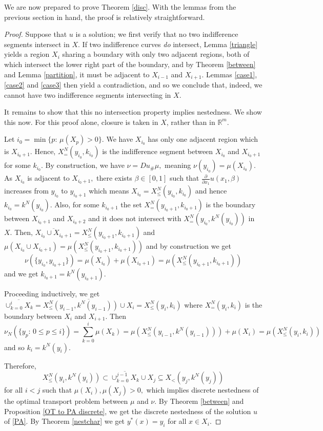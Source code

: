 \documentclass[12pt,reqno]{amsart}
\begin{document}
We are now prepared to prove Theorem \ref{disc}.  With the lemmas from the previous section in hand, the proof is relatively straightforward.

\begin{proof}
Suppose that $u$ is a solution; we first verify that no two indifference segments intersect in $X$.  If two indifference curves \emph{do} intersect, Lemma \ref{triangle} yields a region $X_i$ sharing a boundary with only two adjacent regions, both of which intersect the lower right part of the boundary, and by Theorem \ref{between} and Lemma \ref{partition}, it must be adjacent to $X_{i-1}$ and $X_{i+1}$.  Lemmas \ref{case1}, \ref{case2} and \ref{case3} then yield a contradiction, and so we conclude that, indeed, we cannot have two indifference segments intersecting in $X$.  

It remains to show that this no intersection property implies nestedness.  We show this now. For this proof alone, closure is taken in $X$, rather than in $\mathbb{R}^m.$


    
    
    Let $i_0=\min\{p:\,\mu(X_p)>0\}.$ We have $X_{i_0}$ has only one adjacent region which is $X_{i_0+1}.$  Hence, $X_=^N(y_{i_0},k_{i_0})$ is the indifference segment between $X_{i_0}$ and $X_{i_0+1}$  for some $k_{i_0}.$ By construction, we have $\nu=Du_{\#}\mu,$ meaning  $\nu(y_{i_0})=\mu(X_{i_0}).$ As $X_{i_0}$ is adjacent to $X_{i_0+1},$ there exists $\beta\in[0,1]$ such that $\frac{\partial}{\partial x_1}u(x_1,\beta)$ increases from $y_{i_0}$ to $y_{i_0+1}$ which means $X_{i_0}=X^N_\le(y_{i_0},k_{i_0})$ and hence $k_{i_0}=k^N(y_{i_0}).$ Also, for some $k_{i_0+1}$ the set $X^N_=(y_{i_0+1},k_{i_0+1})$ is the boundary between $X_{i_0+1}$ and $X_{i_0+2}$ and it does not intersect with $X^N_=(y_{i_0},k^N(y_{i_0}))$ in $X.$ Then, $\overline{X_{i_0}\cup X_{i_0+1}}=X^N_\le(y_{i_0+1},k_{i_0+1})$ and $\mu(X_{i_0}\cup X_{i_0+1})=\mu(X^N_\le(y_{i_0+1},k_{i_0+1}))$  and by construction we get 
    \[\nu(\{y_{i_0},y_{i_0+1}\})=\mu(X_{i_0})+\mu(X_{i_0+1})=\mu(X^N_\le(y_{i_0+1},k_{i_0+1}))\] and we get $k_{i_0+1}=k^N(y_{i_0+1}).$

    Proceeding inductively, we get $\overline{\cup_{k=0}^iX_k}= \overline{X^N_\le(y_{i-1},k^N(y_{i-1}))\cup X_{i}}=X^N_\le(y_i,k_i)$ where $X^N_=(y_i,k_i)$ is the boundary between $X_i$ and $X_{i+1}.$ Then 
\[\nu_N(\{y_p:\,0\le p\le i\})=\sum_{k=0}^{i}\mu(X_k)=\mu(X^N_\le(y_{i-1},k^N(y_{i-1})))+\mu(X_{i})=\mu(X^N_\le(y_{i},k_i))\]
and so $k_i=k^N(y_i).$

 Therefore, \[X^N_\le(y_{i},k^N(y_{i}))\subset \overline{\cup_{k=0}^{j-1}X_k}\cup X_j\subseteq X_<(y_{j},k^N(y_{j}))\] for all $i<j$ such that $\mu(X_i),\mu(X_j)>0,$ which implies discrete nestedness of the optimal transport problem between $\mu$ and $\nu$. By Theorem \ref{between} and Proposition \ref{OT to PA discrete}, we get the discrete nestedness of the solution $u$ of \eqref{PA}. By Theorem \ref{nestchar}  we get $y^*(x)=y_i$ for all $x\in X_i.$
\end{proof}
\end{document}
